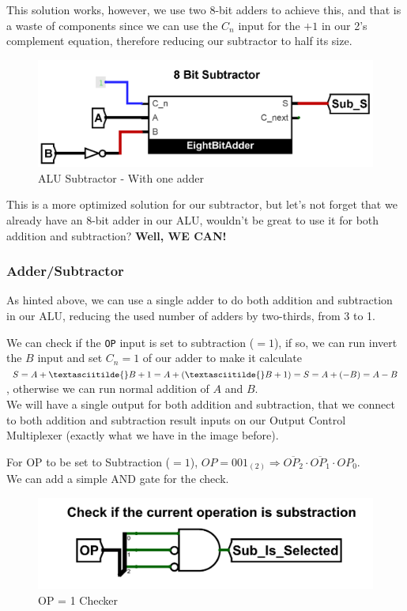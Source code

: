 \documentclass{article}
\begin{document}
This solution works, however, we use two 8-bit adders to achieve this, and that is a waste of components since we can use the $C_n$ input for the $+ 1$ in our 2's complement equation, therefore reducing our subtractor to half its size.

\begin{figure}[H]
    \centering
    \includegraphics[width=.7\textwidth]{circuits/Subtractor_LessStupidWay.png}
    \caption{ALU Subtractor - With one adder}
\end{figure}

This is a more optimized solution for our subtractor, but let's not forget that we already have an 8-bit adder in our ALU, wouldn't be great to use it for both addition and subtraction? \textbf{Well, WE CAN!}

\subsubsection{Adder/Subtractor}
 As hinted above, we can use a single adder to do both addition and subtraction in our ALU, reducing the used number of adders by two-thirds, from 3 to 1.

 We can check if the \verb|OP| input is set to subtraction ($=1$), if so, we can run invert the $B$ input and set $C_n = 1$ of our adder to make it calculate $S = A + \textasciitilde{}B + 1 = A + (\textasciitilde{}B + 1) = S = A + (-B) = A - B$, otherwise we can run normal addition of $A$ and $B$. \\
 We will have a single output for both addition and subtraction, that we connect to both addition and subtraction result inputs on our Output Control Multiplexer (exactly what we have in the image before).

 For OP to be set to Subtraction ($=1$), $OP = 001_{(2)} \Rightarrow{} \overline{OP_2} \cdot \overline{OP_1} \cdot OP_0$.\\
 We can add a simple AND gate for the check.

 \begin{figure}[H]
     \centering
     \includegraphics[width=.6\textwidth]{circuits/SubCheck.png}
     \caption{OP = 1 Checker}
 \end{figure}
\end{document}
